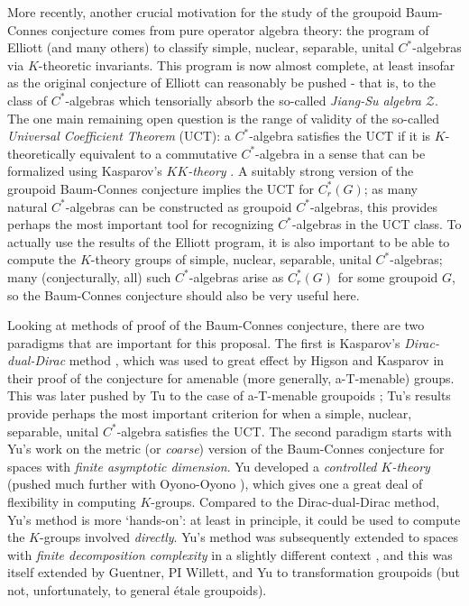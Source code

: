 \documentclass[11pt]{article}
\theoremstyle{plain}
\theoremstyle{definition}
\theoremstyle{remark}
\begin{document}
More recently, another crucial motivation for the study of the groupoid Baum-Connes conjecture comes from pure operator algebra theory: the program of Elliott \cite{Elliott:1995dq} (and many others) to classify simple, nuclear, separable, unital $C^*$-algebras via $K$-theoretic invariants.  This program is now almost complete, at least insofar as the original conjecture of Elliott can reasonably be pushed - that is, to the class of $C^*$-algebras which tensorially absorb the so-called \emph{Jiang-Su algebra} $\mathcal{Z}$.  The one main remaining open question is the range of validity of the so-called \emph{Universal Coefficient Theorem} (UCT): a $C^*$-algebra satisfies the UCT if it is $K$-theoretically equivalent to a commutative $C^*$-algebra in a sense that can be formalized using Kasparov's \emph{$KK$-theory} \cite{Rosenberg:1987bh}.  A suitably strong version of the groupoid Baum-Connes conjecture implies the UCT for $C^*_r(G)$; as many natural $C^*$-algebras can be constructed as groupoid $C^*$-algebras, this provides perhaps the most important tool for recognizing $C^*$-algebras in the UCT class.  To actually use the results of the Elliott program, it is also important to be able to compute the $K$-theory groups of simple, nuclear, separable, unital $C^*$-algebras; many (conjecturally, all) such $C^*$-algebras arise as $C^*_r(G)$ for some groupoid $G$, so the Baum-Connes conjecture should also be very useful here.

Looking at methods of proof of the Baum-Connes conjecture, there are two paradigms that are important for this proposal.   The first is Kasparov's \emph{Dirac-dual-Dirac} method \cite{Kasparov:1988dw}, which was used to great effect by Higson and Kasparov \cite{Higson:2001eb} in their proof of the conjecture for amenable (more generally, a-T-menable) groups.  This was later pushed by Tu to the case of a-T-menable groupoids \cite{Tu:1999bq}; Tu's results provide perhaps the most important criterion for when a simple, nuclear, separable, unital $C^*$-algebra satisfies the UCT.  The second paradigm starts with Yu's work \cite{Yu:1998wj} on the metric (or \emph{coarse}) version of the Baum-Connes conjecture for spaces with \emph{finite asymptotic dimension}.  Yu developed a \emph{controlled $K$-theory} (pushed much further with Oyono-Oyono \cite{Oyono-Oyono:2011fk}), which gives one a great deal of flexibility in computing $K$-groups.  Compared to the Dirac-dual-Dirac method, Yu's method is more `hands-on': at least in principle, it could be used to compute the $K$-groups involved \emph{directly}.  Yu's method was subsequently extended to spaces with \emph{finite decomposition complexity} in a slightly different context \cite{Guentner:2009tg}, and this was itself extended by Guentner, PI Willett, and Yu to transformation groupoids \cite{Guentner:2014bh} (but not, unfortunately, to general \'{e}tale groupoids).
\end{document}
